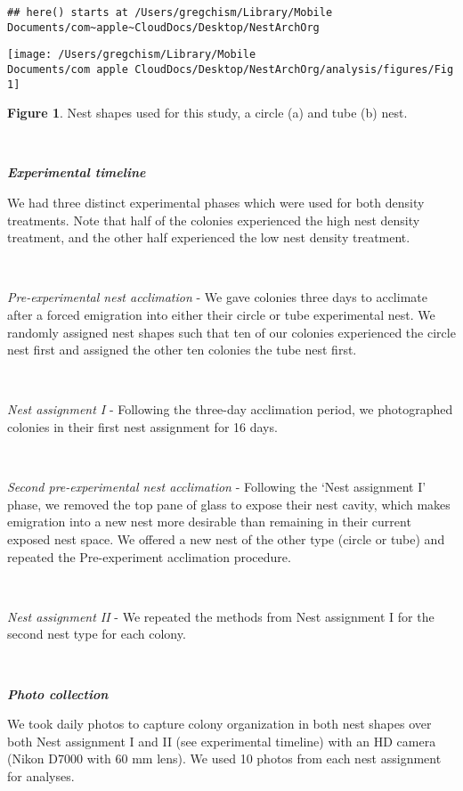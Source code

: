 \documentclass[3p]{elsarticle} %
\begin{document}
\begin{verbatim}
## here() starts at /Users/gregchism/Library/Mobile Documents/com~apple~CloudDocs/Desktop/NestArchOrg
\end{verbatim}

\begin{flushleft}\texttt{[image: /Users/gregchism/Library/Mobile Documents/com~apple~CloudDocs/Desktop/NestArchOrg/analysis/figures/Fig1]} \end{flushleft}

\textbf{Figure 1}. Nest shapes used for this study, a circle (a) and
tube (b) nest.

~

\textbf{\emph{Experimental timeline}}

We had three distinct experimental phases which were used for both
density treatments. Note that half of the colonies experienced the high
nest density treatment, and the other half experienced the low nest
density treatment.

~

\emph{Pre-experimental nest acclimation} - We gave colonies three days
to acclimate after a forced emigration into either their circle or tube
experimental nest. We randomly assigned nest shapes such that ten of our
colonies experienced the circle nest first and assigned the other ten
colonies the tube nest first.

~

\emph{Nest assignment I} - Following the three-day acclimation period,
we photographed colonies in their first nest assignment for 16 days.

~

\emph{Second pre-experimental nest acclimation} - Following the `Nest
assignment I' phase, we removed the top pane of glass to expose their
nest cavity, which makes emigration into a new nest more desirable than
remaining in their current exposed nest space. We offered a new nest of
the other type (circle or tube) and repeated the Pre-experiment
acclimation procedure.

~

\emph{Nest assignment II} - We repeated the methods from Nest assignment
I for the second nest type for each colony.

~

\textbf{\emph{Photo collection}}

We took daily photos to capture colony organization in both nest shapes
over both Nest assignment I and II (see experimental timeline) with an
HD camera (Nikon D7000 with 60 mm lens). We used 10 photos from each
nest assignment for analyses.
\end{document}
